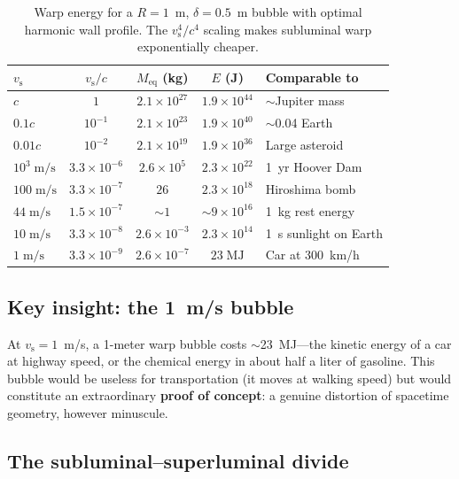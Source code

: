\documentclass[prd,twocolumn,superscriptaddress,longbibliography]{revtex4-2}
\newcommand{\vs}{v_{\mathrm{s}}}
\begin{document}
\begin{table}[t]
\centering
\caption{Warp energy for a $R = 1$~m, $\delta = 0.5$~m bubble
with optimal harmonic wall profile.  The $\vs^4/c^4$ scaling
makes subluminal warp exponentially cheaper.}
\label{tab:energy}
\begin{ruledtabular}
\begin{tabular}{lcccl}
$\vs$ & $\vs/c$ & $M_{\mathrm{eq}}$ (kg) & $E$ (J) & Comparable to \\
\hline
$c$ & $1$ & $2.1\times 10^{27}$ & $1.9\times 10^{44}$
& $\sim$Jupiter mass \\
$0.1c$ & $10^{-1}$ & $2.1\times 10^{23}$ & $1.9\times 10^{40}$
& $\sim$0.04 Earth \\
$0.01c$ & $10^{-2}$ & $2.1\times 10^{19}$ & $1.9\times 10^{36}$
& Large asteroid \\
$10^3\;\mathrm{m/s}$ & $3.3\!\times\!10^{-6}$ & $2.6\times 10^{5}$
& $2.3\times 10^{22}$ & 1~yr Hoover Dam \\
$100\;\mathrm{m/s}$ & $3.3\!\times\!10^{-7}$ & $26$
& $2.3\times 10^{18}$ & Hiroshima bomb \\
$44\;\mathrm{m/s}$ & $1.5\!\times\!10^{-7}$ & $\sim\!1$
& $\sim\!9\times 10^{16}$ & 1~kg rest energy \\
$10\;\mathrm{m/s}$ & $3.3\!\times\!10^{-8}$ & $2.6\!\times\!10^{-3}$
& $2.3\times 10^{14}$ & 1~s sunlight on Earth \\
$1\;\mathrm{m/s}$ & $3.3\!\times\!10^{-9}$ & $2.6\!\times\!10^{-7}$
& $23\;\mathrm{MJ}$ & Car at 300~km/h \\
\end{tabular}
\end{ruledtabular}
\end{table}

\subsection{Key insight: the 1~m/s bubble}

At $\vs = 1$~m/s, a 1-meter warp bubble costs $\sim$23~MJ---the
kinetic energy of a car at highway speed, or the chemical energy
in about half a liter of gasoline.  This bubble would be useless
for transportation (it moves at walking speed) but would constitute
an extraordinary \textbf{proof of concept}: a genuine distortion
of spacetime geometry, however minuscule.

\subsection{The subluminal--superluminal divide}
\end{document}
